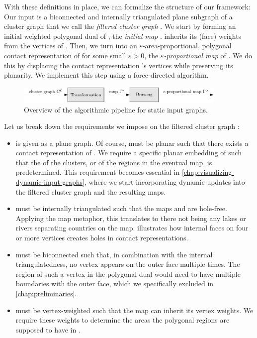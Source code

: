 With these definitions in place, we can formalize the structure of our framework:
Our input is a biconnected and internally triangulated plane subgraph of a cluster graph that we call the \emph{filtered cluster graph} \clustergraph{}.
We start by forming an initial weighted polygonal dual of \clustergraph{}, the \emph{initial map} \initmap{}.
\initmap{} inherits its (face) weights from the vertices of \clustergraph{}.
Then, we turn \initmap{} into an $\varepsilon$-area-proportional, polygonal contact representation of \clustergraph{} for some small $\varepsilon > 0$, the \emph{$\varepsilon$-proportional map} \propmap{} of \clustergraph{}.
We do this by displacing the contact representation \initmap{}'s vertices while preserving its planarity.
We implement this step using a force-directed algorithm.

\begin{figure}[H]
	\centering\includegraphics[width=0.9\textwidth]{Resources/Framework-1.pdf}
	\caption{Overview of the algorithmic pipeline for static input graphs.}
	\label{fig:static-pipeline-thesis}
\end{figure}

Let us break down the requirements we impose on the filtered cluster graph \clustergraph{}:

\begin{itemize}
\item \clustergraph{} is given as a plane graph.
Of course, \clustergraph{} must be planar such that there exists a contact representation of \clustergraph{}.
We require a specific planar embedding of \clustergraph{} such that the  of the clusters, or of the regions in the eventual map, is predetermined.
This requirement becomes essential in \cref{chap:visualizing-dynamic-input-graphs}, where we start incorporating dynamic updates into the filtered cluster graph and the resulting maps.
\item \clustergraph{} must be internally triangulated such that the maps \initmap{} and \propmap{} are hole-free.
Applying the map metaphor, this translates to there not being any lakes or rivers separating countries on the map.
 illustrates how internal faces on four or more vertices creates holes in contact representations.
\item \clustergraph{} must be biconnected such that, in combination with the internal triangulatedness, no vertex appears on the outer face multiple times.
The region of such a vertex in the polygonal dual would need to have multiple boundaries with the outer face, which we specifically excluded in \cref{chap:preliminaries}.
\item \clustergraph{} must be vertex-weighted such that the map \initmap{} can inherit its vertex weights.
We require these weights to determine the areas the polygonal regions are supposed to have in \propmap{}.
\end{itemize}

